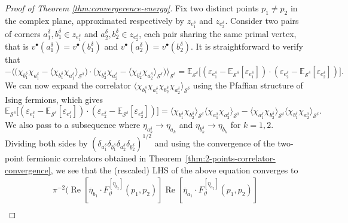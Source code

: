 \documentclass[reqno]{amsart}
\numberwithin{equation}{section}
\theoremstyle{definition}
\theoremstyle{remark}
\renewcommand\Re{\operatorname{Re}}
\newcommand\cS{\mathcal{S}}
\begin{document}
\begin{proof}[Proof of Theorem \ref{thm:convergerence-energy}]
Fix two distinct points $p_1 \neq p_2$ in the complex plane, approximated respectively by $z_{e_1^{\delta}}$ and $z_{e_2^{\delta}}$. Consider two pairs of corners $a_{1}^{\delta}, b_{1}^\delta \in z_{e_1^{\delta}}$ and $a_{2}^{\delta}, b_{2}^\delta \in z_{e_2^{\delta}}$, each pair sharing the same primal vertex, that is $v^{\bullet}(a_{1}^{\delta}) = v^{\bullet}(b_{1}^{\delta})$ and $v^{\bullet}(a_{2}^{\delta}) = v^{\bullet}(b_{2}^{\delta})$. It is straightforward to verify that 
\begin{equation*}
	-\big\langle \big(\chi_{b_1^\delta}  \chi_{a_1^\delta} - \langle \chi_{b_1^\delta}  \chi_{a_1^\delta} \rangle_{\cS^\delta} \big) \cdot \big(\chi_{b_2^\delta}  \chi_{a_2^\delta} - \langle \chi_{b_2^\delta}  \chi_{a_2^\delta} \rangle_{\cS^\delta} \big) \big\rangle_{\cS^\delta}
	= \mathbb{E}_{\cS^\delta}\big[ (\varepsilon_{e_1^\delta} - \mathbb{E}_{\cS^\delta}[\varepsilon_{e_1^\delta}]) \cdot (\varepsilon_{e_2^\delta} - \mathbb{E}_{\cS^\delta}[\varepsilon_{e_2^\delta}]) \big].
\end{equation*}
We can now expand the correlator $\big\langle \chi_{b_1^\delta} \chi_{a_1^\delta} \chi_{b_2^\delta} \chi_{a_2^\delta} \big\rangle_{\cS^\delta}$ using the Pfaffian structure of Ising fermions, which gives
\begin{equation*}
	\mathbb{E}_{\cS^\delta}\big[ (\varepsilon_{e_1^\delta} - \mathbb{E}_{\cS^\delta}[\varepsilon_{e_1^\delta}]) \cdot (\varepsilon_{e_2^\delta} - \mathbb{E}_{\cS^\delta}[\varepsilon_{e_2^\delta}]) \big]
	= \langle \chi_{b_{1}^\delta}\chi_{b_{2}^\delta} \rangle_{\cS^\delta}\langle \chi_{a_{1}^\delta}\chi_{a_{2}^\delta} \rangle_{\cS^\delta}
	- \langle \chi_{a_{1}^\delta}\chi_{b_{2}^\delta} \rangle_{\cS^\delta}\langle \chi_{b_{1}^\delta}\chi_{a_{2}^\delta} \rangle_{\cS^\delta}.
\end{equation*}
We also pass to a subsequence where $\eta_{a^\delta_{k}} \to \eta_{a_k}$ and $\eta_{b^\delta_{k}} \to \eta_{b_k}$ for $k=1,2 $. Dividing both sides by $(\delta_{a^\delta_1} \delta_{b^\delta_1}\delta_{a^\delta_2}\delta_{b^\delta_2})^{1/2}$ and using the convergence of the two-point fermionic correlators obtained in Theorem~\ref{thm:2-points-correlator-convergence}, we see that the (rescaled) LHS of the above equation converges to
\begin{multline*}
	\pi^{-2}\Big(\Re[\overline{\eta}_{b_1} \cdot F_{\vartheta}^{[\eta_{b_2}]}(p_1,p_2)]\Re[\overline{\eta}_{a_1} \cdot F_{\vartheta}^{[\eta_{a_2}]}(p_1,p_2)]\\

\end{multline*}
\end{proof}
\end{document}
